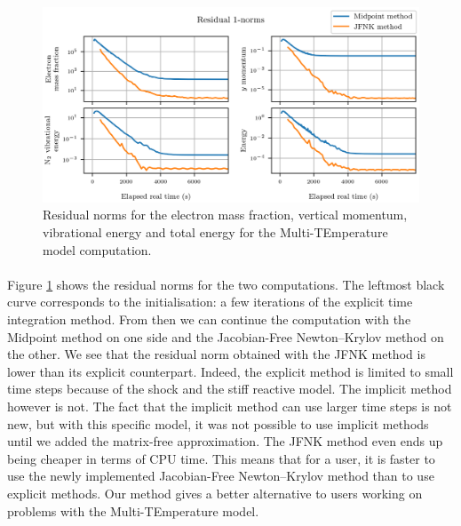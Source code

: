         \begin{figure}
          \centering
          \includegraphics{figures/sphere_mte_residuals.png}
          \caption{Residual norms for the electron mass fraction, vertical momentum,  vibrational energy and total energy for the Multi-TEmperature model computation.}
          \label{fig:sphere_mte_residuals}
        \end{figure}

        \paragraph{}
        Figure \ref{fig:sphere_mte_residuals} shows the residual norms for the two computations.
        The leftmost black curve corresponds to the initialisation: a few iterations of the explicit time integration method.
        From then we can continue the computation with the Midpoint method on one side and the Jacobian-Free Newton--Krylov method on the other.
        We see that the residual norm obtained with the JFNK method is lower than its explicit counterpart.
        Indeed, the explicit method is limited to small time steps because of the shock and the stiff reactive model.
        The implicit method however is not.
        The fact that the implicit method can use larger time steps is not new, but with this specific model, it was not possible to use implicit methods until we added the matrix-free approximation.
        The JFNK method even ends up being cheaper in terms of CPU time.
        This means that for a user, it is faster to use the newly implemented Jacobian-Free Newton--Krylov method than to use explicit methods.
        Our method gives a better alternative to users working on problems with the Multi-TEmperature model.


